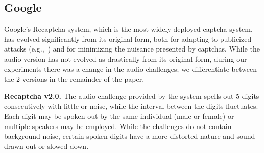 \subsection{Google \re}
\label{sec:recaptcha}

Google's Recaptcha system, which is the most widely deployed captcha system,
has evolved significantly from its original form, both for adapting to publicized 
attacks (e.g.,~\cite{GoodfellowBIAS13}) and for minimizing the nuisance 
presented by captchas. While the audio version has not evolved as drastically from its original 
form, during our experiments there was a change in the audio challenges; we 
differentiate between the 2 versions in the remainder of the paper.


\textbf{Recaptcha v2.0.} The audio challenge provided by the \re system spells out 5 digits
consecutively with little or noise, while the interval between the digits fluctuates. 
Each digit may be spoken out by the same individual (male or female) or multiple 
speakers may be employed. While the challenges do not contain background noise, certain 
spoken digits have a more distorted nature and sound drawn out or slowed down.  %

%

